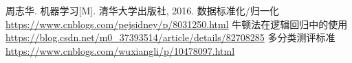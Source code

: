 \documentclass{article}
\begin{document}
\begin{thebibliography}{1}
 周志华. 机器学习[M]. 清华大学出版社, 2016.
 数据标准化/归一化\\\url{https://www.cnblogs.com/pejsidney/p/8031250.html}
 牛顿法在逻辑回归中的使用\\\url{https://blog.csdn.net/m0_37393514/article/details/82708285}
 多分类测评标准\\\url{https://www.cnblogs.com/wuxiangli/p/10478097.html}
\end{thebibliography}
\end{document}
